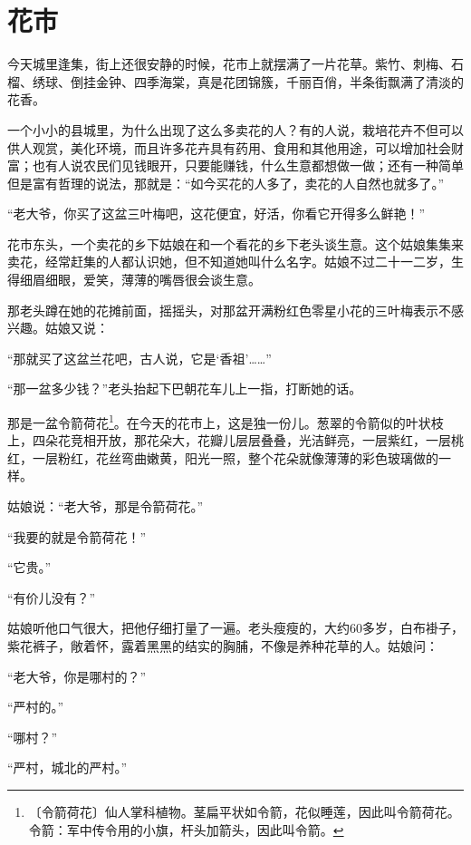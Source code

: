 \documentclass[12pt,UTF-8,openany]{ctexbook}
\begin{document}
\chapter{花市}

\begin{normalsize}
    
    今天城里逢集，街上还很安静的时候，花市上就摆满了一片花草。紫竹、刺梅、石榴、绣球、倒挂金钟、四季海棠，真是花团锦簇，千丽百俏，半条街飘满了清淡的花香。
    
    一个小小的县城里，为什么出现了这么多卖花的人？有的人说，栽培花卉不但可以供人观赏，美化环境，而且许多花卉具有药用、食用和其他用途，可以增加社会财富；也有人说农民们见钱眼开，只要能赚钱，什么生意都想做一做；还有一种简单但是富有哲理的说法，那就是：“如今买花的人多了，卖花的人自然也就多了。”
    
    “老大爷，你买了这盆三叶梅吧，这花便宜，好活，你看它开得多么鲜艳！”
    
    花市东头，一个卖花的乡下姑娘在和一个看花的乡下老头谈生意。这个姑娘集集来卖花，经常赶集的人都认识她，但不知道她叫什么名字。姑娘不过二十一二岁，生得细眉细眼，爱笑，薄薄的嘴唇很会谈生意。
    
    那老头蹲在她的花摊前面，摇摇头，对那盆开满粉红色零星小花的三叶梅表示不感兴趣。姑娘又说：
    
    “那就买了这盆兰花吧，古人说，它是‘香祖’……”
    
    “那一盆多少钱？”老头抬起下巴朝花车儿上一指，打断她的话。
    
    那是一盆令箭荷花\footnote{〔令箭荷花〕仙人掌科植物。茎扁平状如令箭，花似睡莲，因此叫令箭荷花。令箭：军中传令用的小旗，杆头加箭头，因此叫令箭。}。在今天的花市上，这是独一份儿。葱翠的令箭似的叶状枝上，四朵花竞相开放，那花朵大，花瓣儿层层叠叠，光洁鲜亮，一层紫红，一层桃红，一层粉红，花丝弯曲嫩黄，阳光一照，整个花朵就像薄薄的彩色玻璃做的一样。
    
    姑娘说：“老大爷，那是令箭荷花。”
    
    “我要的就是令箭荷花！”
    
    “它贵。”
    
    “有价儿没有？”
    
    姑娘听他口气很大，把他仔细打量了一遍。老头瘦瘦的，大约60多岁，白布褂子，紫花裤子，敞着怀，露着黑黑的结实的胸脯，不像是养种花草的人。姑娘问：
    
    “老大爷，你是哪村的？”
    
    “严村的。”
    
    “哪村？”
    
    “严村，城北的严村。”
    

\end{normalsize}
\end{document}
